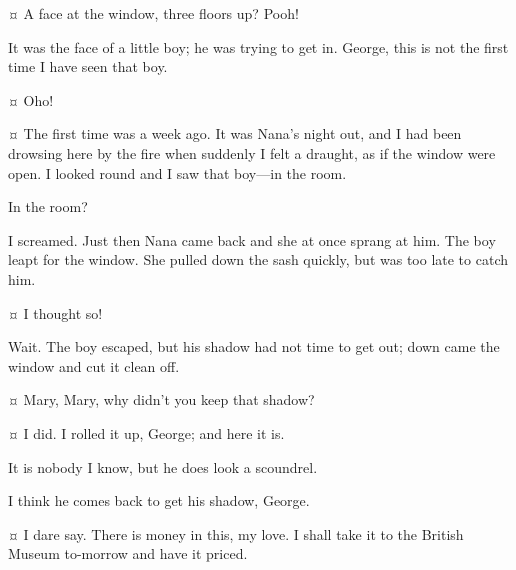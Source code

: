 \begin{drama}
\mrdarlingspeaks {}¤
A face at the window, three floors up?
Pooh!

\mrsdarlingspeaks
It was the face of a little boy; he was trying to get in.
George, this is not the first time I have seen that boy.

\mrdarlingspeaks {}¤
Oho!

\mrsdarlingspeaks {}¤
The first time was a week ago.
It was Nana's night out, and I had been drowsing here by the fire when suddenly I felt a draught,
as if the window were open.
I looked round and I saw that boy—in the room.

\mrdarlingspeaks
In the room?

\mrsdarlingspeaks
I screamed.
Just then Nana came back and she at once sprang at him.
The boy leapt for the window.
She pulled down the sash quickly, but was too late to catch him.

\mrdarlingspeaks {}¤
I thought so!

\mrsdarlingspeaks
Wait.
The boy escaped, but his shadow had not time to get out; down came the window and cut it clean off.

\mrdarlingspeaks {}¤
Mary, Mary, why didn't you keep that shadow?

\mrsdarlingspeaks {}¤
I did.
I rolled it up, George; and here it is.


\mrdarlingspeaks
It is nobody I know, but he does look a scoundrel.

\mrsdarlingspeaks
I think he comes back to get his shadow, George.

\mrdarlingspeaks {}¤
I dare say.
There is money in this, my love.
I shall take it to the British Museum to-morrow and have it priced.



\end{drama}
